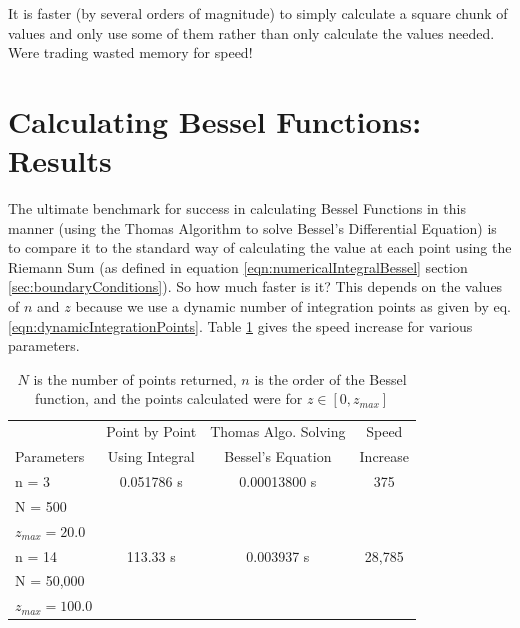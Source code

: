 \documentclass[onecolumn, groupedaddress, 10pt]{revtex4-1}
\begin{document}
It is faster (by several orders of magnitude) to simply calculate a square chunk of values and only use some of them rather than only calculate the values needed.  Were trading wasted memory for speed!






\section{Calculating Bessel Functions: Results}
The ultimate benchmark for success in calculating Bessel Functions in this manner (using the Thomas Algorithm to solve Bessel's Differential Equation) is to compare it to the standard way of calculating the value at each point using the Riemann Sum (as defined in equation \ref{eqn:numericalIntegralBessel} section \ref{sec:boundaryConditions}).  So how much faster is it?  This depends on the values of $n$ and $z$ because we use a dynamic number of integration points as given by eq. \ref{eqn:dynamicIntegrationPoints}. Table \ref{table:besselSpeed} gives the speed increase for various parameters.

\begin{table}[H]
	\centering
	\begin{tabular}{l || c | c | c }
		                  & Point by Point & Thomas Algo. Solving &  Speed	\\
		Parameters        & Using Integral &  Bessel's Equation   & Increase	\\
		\hline
		\hline
		n = 3             &   0.051786 s   &      0.00013800 s    &   375		\\
		N = 500           &                &                      &			\\
		$z_{max} = 20.0$  &                &                      &			\\
		\hline
		n = 14            &     113.33 s   &       0.003937 s     & 28,785	\\
		N = 50,000        &                &                      &           \\
		$z_{max} = 100.0$ &                &                      &           \\
	\end{tabular}
	\caption{\label{table:besselSpeed} $N$ is the number of points returned, $n$ is the order of the Bessel function, and the points calculated were for $z \in [0,z_{max}]$ }
\end{table}
\end{document}
